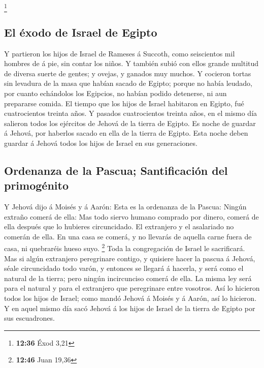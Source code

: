 \footnote{\textbf{12:36} Éxod 3,21}

\hypertarget{el-uxe9xodo-de-israel-de-egipto}{%
\subsection{El éxodo de Israel de
Egipto}\label{el-uxe9xodo-de-israel-de-egipto}}

 Y partieron los hijos de Israel de Rameses á Succoth,
como seiscientos mil hombres de á pie, sin contar los niños.
 Y también subió con ellos grande multitud de diversa
suerte de gentes; y ovejas, y ganados muy muchos.  Y
cocieron tortas sin levadura de la masa que habían sacado de Egipto;
porque no había leudado, por cuanto echándolos los Egipcios, no habían
podido detenerse, ni aun prepararse comida.  El tiempo
que los hijos de Israel habitaron en Egipto, fué cuatrocientos treinta
años.  Y pasados cuatrocientos treinta años, en el mismo
día salieron todos los ejércitos de Jehová de la tierra de Egipto.
 Es noche de guardar á Jehová, por haberlos sacado en
ella de la tierra de Egipto. Esta noche deben guardar á Jehová todos los
hijos de Israel en sus generaciones.

\hypertarget{ordenanza-de-la-pascua-santificaciuxf3n-del-primoguxe9nito}{%
\subsection{Ordenanza de la Pascua; Santificación del
primogénito}\label{ordenanza-de-la-pascua-santificaciuxf3n-del-primoguxe9nito}}

 Y Jehová dijo á Moisés y á Aarón: Esta es la ordenanza
de la Pascua: Ningún extraño comerá de ella:  Mas todo
siervo humano comprado por dinero, comerá de ella después que lo
hubieres circuncidado.  El extranjero y el asalariado no
comerán de ella.  En una casa se comerá, y no llevarás de
aquella carne fuera de casa, ni quebraréis hueso suyo. \footnote{\textbf{12:46}
  Juan 19,36}  Toda la congregación de Israel le
sacrificará.  Mas si algún extranjero peregrinare
contigo, y quisiere hacer la pascua á Jehová, séale circuncidado todo
varón, y entonces se llegará á hacerla, y será como el natural de la
tierra; pero ningún incircunciso comerá de ella.  La
misma ley será para el natural y para el extranjero que peregrinare
entre vosotros.  Así lo hicieron todos los hijos de
Israel; como mandó Jehová á Moisés y á Aarón, así lo hicieron.
 Y en aquel mismo día sacó Jehová á los hijos de Israel
de la tierra de Egipto por sus escuadrones.

